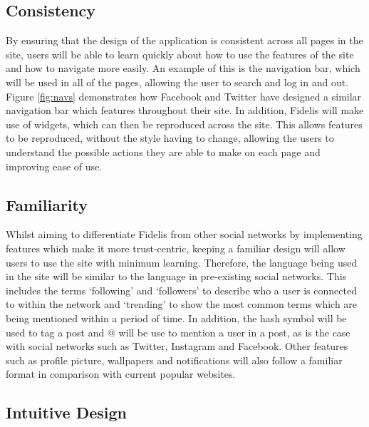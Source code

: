 \subsection{Consistency}
By ensuring that the design of the application is consistent across all pages in the site, users will be able to learn quickly about how to use the features of the site and how to navigate more easily. An example of this is the navigation bar, which will be used in all of the pages, allowing the user to search and log in and out. Figure \ref{fig:navs} demonstrates how Facebook and Twitter have designed a similar navigation bar which features throughout their site. In addition, Fidelis will make use of widgets, which can then be reproduced across the site. This allows features to be reproduced, without the style having to change, allowing the users to understand the possible actions they are able to make on each page and improving ease of use.

\subsection{Familiarity}
Whilst aiming to differentiate Fidelis from other social networks by implementing features which make it more trust-centric, keeping a familiar design will allow users to use the site with minimum learning. Therefore, the language being used in the site will be similar to the language in pre-existing social networks. This includes the terms `following' and `followers' to describe who a user is connected to within the network and `trending' to show the most common terms which are being mentioned within a period of time. In addition, the hash symbol will be used to tag a post and @ will be use to mention a user in a post, as is the case with social networks such as Twitter, Instagram and Facebook. Other features such as profile picture, wallpapers and notifications will also follow a familiar format in comparison with current popular websites.

\subsection{Intuitive Design}